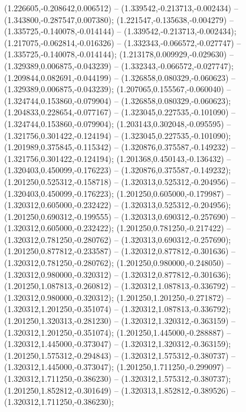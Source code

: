  (1.226605,-0.208642,0.006512) -- (1.339542,-0.213713,-0.002434) -- (1.343800,-0.287547,0.007380);
 (1.221547,-0.135638,-0.004279) -- (1.335725,-0.140078,-0.014144) -- (1.339542,-0.213713,-0.002434);
 (1.217075,-0.062814,-0.016326) -- (1.332343,-0.066572,-0.027747) -- (1.335725,-0.140078,-0.014144);
 (1.213178,0.009929,-0.029630) -- (1.329389,0.006875,-0.043239) -- (1.332343,-0.066572,-0.027747);
 (1.209844,0.082691,-0.044199) -- (1.326858,0.080329,-0.060623) -- (1.329389,0.006875,-0.043239);
 (1.207065,0.155567,-0.060040) -- (1.324744,0.153860,-0.079904) -- (1.326858,0.080329,-0.060623);
 (1.204833,0.228654,-0.077167) -- (1.323045,0.227535,-0.101090) -- (1.324744,0.153860,-0.079904);
 (1.203143,0.302048,-0.095595) -- (1.321756,0.301422,-0.124194) -- (1.323045,0.227535,-0.101090);
 (1.201989,0.375845,-0.115342) -- (1.320876,0.375587,-0.149232) -- (1.321756,0.301422,-0.124194);
 (1.201368,0.450143,-0.136432) -- (1.320403,0.450099,-0.176223) -- (1.320876,0.375587,-0.149232);
 (1.201250,0.525312,-0.158718) -- (1.320313,0.525312,-0.204956) -- (1.320403,0.450099,-0.176223);
 (1.201250,0.605000,-0.179987) -- (1.320312,0.605000,-0.232422) -- (1.320313,0.525312,-0.204956);
 (1.201250,0.690312,-0.199555) -- (1.320313,0.690312,-0.257690) -- (1.320312,0.605000,-0.232422);
 (1.201250,0.781250,-0.217422) -- (1.320312,0.781250,-0.280762) -- (1.320313,0.690312,-0.257690);
 (1.201250,0.877812,-0.233587) -- (1.320312,0.877812,-0.301636) -- (1.320312,0.781250,-0.280762);
 (1.201250,0.980000,-0.248050) -- (1.320312,0.980000,-0.320312) -- (1.320312,0.877812,-0.301636);
 (1.201250,1.087813,-0.260812) -- (1.320312,1.087813,-0.336792) -- (1.320312,0.980000,-0.320312);
 (1.201250,1.201250,-0.271872) -- (1.320312,1.201250,-0.351074) -- (1.320312,1.087813,-0.336792);
 (1.201250,1.320313,-0.281230) -- (1.320312,1.320312,-0.363159) -- (1.320312,1.201250,-0.351074);
 (1.201250,1.445000,-0.288887) -- (1.320312,1.445000,-0.373047) -- (1.320312,1.320312,-0.363159);
 (1.201250,1.575312,-0.294843) -- (1.320312,1.575312,-0.380737) -- (1.320312,1.445000,-0.373047);
 (1.201250,1.711250,-0.299097) -- (1.320312,1.711250,-0.386230) -- (1.320312,1.575312,-0.380737);
 (1.201250,1.852812,-0.301649) -- (1.320313,1.852812,-0.389526) -- (1.320312,1.711250,-0.386230);
